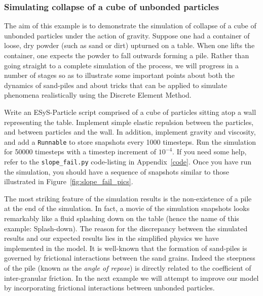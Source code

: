 \subsubsection{Simulating collapse of a cube of unbonded particles}

The aim of this example is to demonstrate the simulation of collapse of a cube of unbonded particles under the action of gravity. Suppose one had a container of loose, dry powder (such as sand or dirt) upturned on a table. When one lifts the container, one expects the powder to fall outwards forming a pile. Rather than going straight to a complete simulation of the process, we will progress in a number of stages so as to illustrate some important points about both the dynamics of sand-piles and about tricks that can be applied to simulate phenomena realistically using the Discrete Element Method.  

Write an ESyS-Particle script comprised of a cube of particles sitting atop a wall representing the table. Implement simple elastic repulsion between the particles, and between particles and the wall. In addition, implement gravity and viscosity, and add a \texttt{Runnable} to store snapshots every 1000 timesteps. Run the simulation for 50000 timesteps with a timestep increment of $10^{-4}$. If you need some help, refer to the \texttt{slope\_fail.py} code-listing in Appendix~\ref{code}. Once you have run the simulation, you should have a sequence of snapshots similar to those illustrated in Figure~\ref{fig:slope_fail_pics}. 

The most striking feature of the simulation results is the non-existence of a pile at the end of the simulation. In fact, a movie of the simulation snapshots looks remarkably like a fluid splashing down on the table (hence the name of this example: Splash-down). The reason for the discrepancy between the simulated results and our expected results lies in the simplified physics we have implemented in the model. It is well-known that the formation of sand-piles is governed by frictional interactions between the sand grains. Indeed the steepness of the pile (known as the \emph{angle of repose}) is directly related to the coefficient of inter-granular friction. In the next example we will attempt to improve our model by incorporating frictional interactions between unbonded particles.

